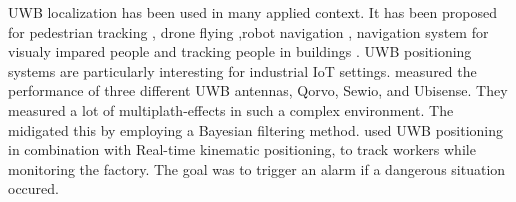 UWB localization has been used in many applied context.
It has been proposed for pedestrian tracking \cite{otim2019effects}, drone flying \cite{macoir2019uwb},robot navigation \cite{zhu2020adapted}, navigation system for visualy impared people \cite{rosiak2024effectiveness} and tracking people in buildings \cite{elbaum2024investigating}.
UWB positioning systems are particularly interesting for industrial IoT settings.
\cite{barbieri2021uwb} measured the performance of three different UWB antennas, Qorvo, Sewio, and Ubisense. They measured a lot of multiplath-effects in such a complex environment. The midigated this by employing a Bayesian filtering method.
\cite{belli2024cloud} used UWB positioning in combination with Real-time kinematic positioning, to track workers while monitoring the factory. The goal was to trigger an alarm if a dangerous situation occured.
